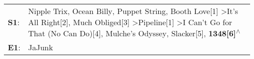 \begin{supertabular}{p{0.03\textwidth}p{0.92\textwidth}}
 \textbf{S1}:  &  Nipple Trix\textsuperscript{}, \enspace Ocean Billy\textsuperscript{}, \enspace Puppet String\textsuperscript{}, \enspace Booth Love[1]\textsuperscript{} \textgreater \enspace It's All Right[2]\textsuperscript{}, \enspace Much Obliged[3]\textsuperscript{} \textgreater \enspace Pipeline[1]\textsuperscript{} \textgreater \enspace I Can't Go for That (No Can Do)[4]\textsuperscript{}, \enspace Mulche's Odyssey\textsuperscript{}, \enspace Slacker[5]\textsuperscript{}, \enspace \textbf{1348[6]\textsuperscript{$\wedge$}}  \enspace  \\
 \textbf{E1}:  &                                                                                                                                                                                                                                                                                                                                                                                                                                                                                                                 JaJunk\textsuperscript{}  \enspace  \\
\end{supertabular}
